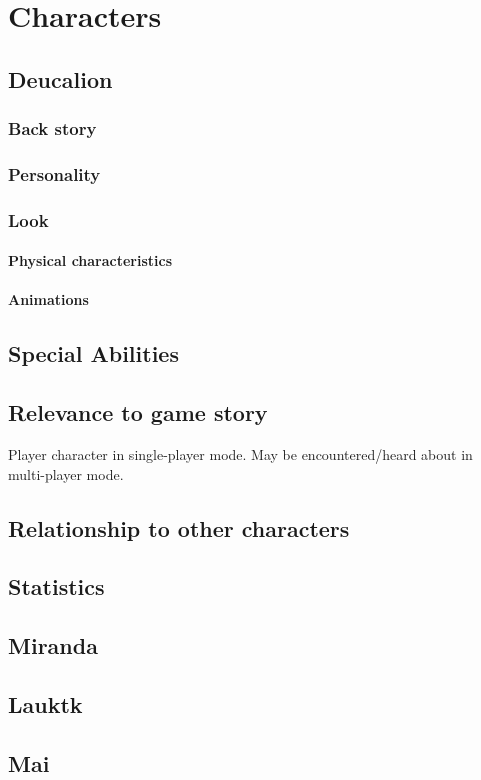 \section{Characters}
\subsection{Deucalion}
\subsubsection{Back story}
\subsubsection{Personality}
\subsubsection{Look}
\paragraph{Physical characteristics}
\paragraph{Animations}
\subsection{Special Abilities}
\subsection{Relevance to game story}
Player character in single-player mode. May be encountered/heard about in multi-player mode.
\subsection{Relationship to other characters}
\subsection{Statistics}

\subsection{Miranda}

\subsection{Lauktk}

\subsection{Mai}

